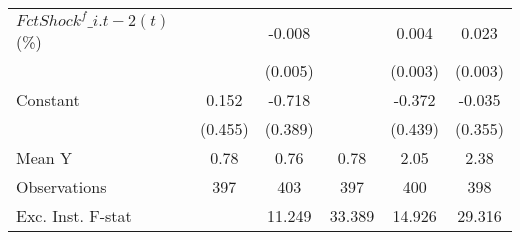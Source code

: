 {\begin{tabular}{l*{5}{c}}
\addlinespace
$ FctShock^f\_{i.t-2}(t)$ (\%)&                     &      -0.008         &                     &       0.004         &       0.023\sym{***}\\
                    &                     &     (0.005)         &                     &     (0.003)         &     (0.003)         \\
\addlinespace
Constant            &       0.152         &      -0.718\sym{*}  &                     &      -0.372         &      -0.035         \\
                    &     (0.455)         &     (0.389)         &                     &     (0.439)         &     (0.355)         \\
\midrule
Mean Y              &        0.78         &        0.76         &        0.78         &        2.05         &        2.38         \\
Observations        &         397         &         403         &         397         &         400         &         398         \\
Exc. Inst. F-stat   &                     &      11.249         &      33.389         &      14.926         &      29.316         \\
\bottomrule
\end{tabular}
}
